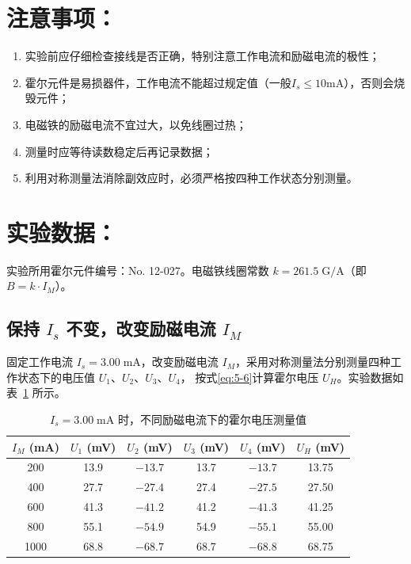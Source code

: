 \section{注意事项：}
\begin{enumerate}[label=\arabic* 、, leftmargin=4em, labelsep=0pt]
    \item 实验前应仔细检查接线是否正确，特别注意工作电流和励磁电流的极性；
    \item 霍尔元件是易损器件，工作电流不能超过规定值（一般$I_s \leq 10\text{mA}$），否则会烧毁元件；
    \item 电磁铁的励磁电流不宜过大，以免线圈过热；
    \item 测量时应等待读数稳定后再记录数据；
    \item 利用对称测量法消除副效应时，必须严格按四种工作状态分别测量。
\end{enumerate}

\section{实验数据：}

\noindent 实验所用霍尔元件编号：No. 12-027。电磁铁线圈常数 $k = 261.5\;\text{G/A}$（即 $B = k \cdot I_M$）。

\subsection{保持 $I_s$ 不变，改变励磁电流 $I_M$}

固定工作电流 $I_s = 3.00\;\text{mA}$，改变励磁电流 $I_M$，采用对称测量法分别测量四种工作状态下的电压值 $U_1$、$U_2$、$U_3$、$U_4$，
按式\eqref{eq:5-6}计算霍尔电压 $U_H$。实验数据如表~\ref{tab:data1} 所示。

\begin{table}[htbp]
    \centering
    \caption{$I_s = 3.00\;\text{mA}$ 时，不同励磁电流下的霍尔电压测量值}
    \label{tab:data1}
    \begin{tabular}{cccccc}
        \hline
        $I_M$ (mA) & $U_1$ (mV) & $U_2$ (mV) & $U_3$ (mV) & $U_4$ (mV) & $U_H$ (mV) \\
        \hline
        200 &  13.9  & $-13.7$ &  13.7  & $-13.7$ & 13.75 \\
        400 &  27.7  & $-27.4$ &  27.4  & $-27.5$ & 27.50 \\
        600 &  41.3  & $-41.2$ &  41.2  & $-41.3$ & 41.25 \\
        800 &  55.1  & $-54.9$ &  54.9  & $-55.1$ & 55.00 \\
        1000&  68.8  & $-68.7$ &  68.7  & $-68.8$ & 68.75 \\
        \hline
    \end{tabular}
\end{table}

